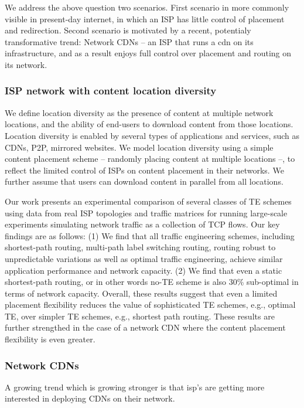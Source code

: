 We address the above question two scenarios. First scenario in more commonly visible in present-day internet, in which an ISP has little control of placement and redirection. Second scenario is motivated by a recent, potentialy transformative trend: Network CDNs -- an ISP that runs a cdn on its infrastructure, and as a result enjoys full control over placement and routing on its network.

\subsubsection{ISP network with content location diversity}

We define location diversity as the presence of content at multiple network locations, and the ability of end-users to download content from those locations. Location diversity is enabled by several types of applications and services, such as CDNs, P2P, mirrored websites. We model location diversity using a simple content placement scheme -- randomly placing content at multiple locations --, to reflect the limited control of ISPs on content placement in their networks. We further assume that users can download content in parallel from all locations. 

Our work presents an experimental comparison of several classes of TE schemes using data from real ISP topologies and traffic matrices for running large-scale experiments simulating network traffic as a collection of TCP flows. Our key findings are as follows: (1) We find that all traffic engineering schemes, including shortest-path routing, multi-path label switching routing, routing robust to unpredictable variations as well as optimal traffic engineering, achieve similar application performance and network capacity.   (2) We find that even a static shortest-path routing, or in other words no-TE scheme is also 30\% sub-optimal in terms of network capacity. Overall, these results suggest that even a limited placement flexibility reduces the value of sophisticated TE schemes, e.g., optimal TE, over simpler TE schemes, e.g., shortest path routing. These results are further strengthed in the case of a network CDN where the content placement flexibility is even greater.


\subsubsection{Network CDNs}


A growing trend which is growing stronger is that isp's are getting more interested in deploying CDNs on their network.

